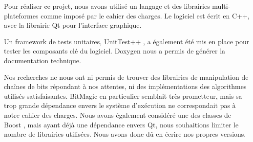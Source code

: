 Pour réaliser ce projet, nous avons utilisé un langage et des librairies multi-plateformes comme imposé par le cahier des charges. Le logiciel est écrit en C++, avec la librairie Qt \cite{Qt} pour l'interface graphique.

Un framework de tests unitaires, UnitTest++ \cite{UnitTest}, a également été mis en place pour tester les composants clé du logiciel. Doxygen \cite{Doxygen} nous a permis de générer la documentation technique.

Nos recherches ne nous ont ni permis de trouver des librairies de manipulation de chaînes de bits répondant à nos attentes, ni des implémentations des algorithmes utilisés satisfaisantes. BitMagic \cite{BitMagic} en particulier semblait très prometteur, mais sa trop grande dépendance envers le système d'exécution ne correspondait pas à notre cahier des charges. Nous avons également considéré une des classes de Boost \cite{Boost}, mais ayant déjà une dépendance envers Qt, nous souhaitions limiter le nombre de librairies utilisées. Nous avons donc dû en écrire nos propres versions.
